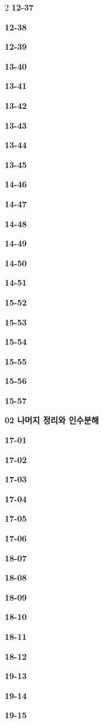\documentclass[10pt,a4paper]{article}
\begin{document}
\begin{multicols}{2}
\noindent\textbf{12-37}\ \par
\noindent\textbf{12-38}\ \par
\noindent\textbf{12-39}\ \par
\noindent\textbf{13-40}\ \par
\noindent\textbf{13-41}\ \par
\noindent\textbf{13-42}\ \par
\noindent\textbf{13-43}\ \par
\noindent\textbf{13-44}\ \par
\noindent\textbf{13-45}\ \par
\noindent\textbf{14-46}\ \par
\noindent\textbf{14-47}\ \par
\noindent\textbf{14-48}\ \par
\noindent\textbf{14-49}\ \par
\noindent\textbf{14-50}\ \par
\noindent\textbf{14-51}\ \par
\noindent\textbf{15-52}\ \par
\noindent\textbf{15-53}\ \par
\noindent\textbf{15-54}\ \par
\noindent\textbf{15-55}\ \par
\noindent\textbf{15-56}\ \par
\noindent\textbf{15-57}\ \par
\noindent\textbf{02 나머지 정리와 인수분해}\par\smallskip
\noindent\textbf{17-01}\ \par
\noindent\textbf{17-02}\ \par
\noindent\textbf{17-03}\ \par
\noindent\textbf{17-04}\ \par
\noindent\textbf{17-05}\ \par
\noindent\textbf{17-06}\ \par
\noindent\textbf{18-07}\ \par
\noindent\textbf{18-08}\ \par
\noindent\textbf{18-09}\ \par
\noindent\textbf{18-10}\ \par
\noindent\textbf{18-11}\ \par
\noindent\textbf{18-12}\ \par
\noindent\textbf{19-13}\ \par
\noindent\textbf{19-14}\ \par
\noindent\textbf{19-15}\ \par

\end{multicols}
\end{document}
